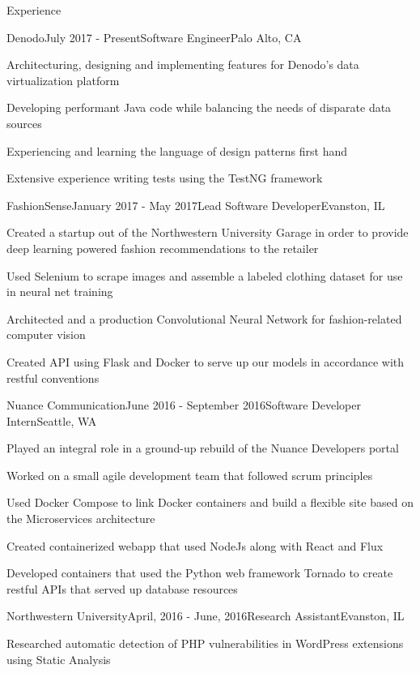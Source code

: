 \documentclass{resume} %
\begin{document}
\begin{rSection}{Experience}

\begin{rSubsection}{Denodo}{July 2017 - Present}{Software Engineer}{Palo Alto, CA}
\item Architecturing, designing and implementing features for Denodo's data virtualization platform
\item Developing performant Java code while balancing the needs of disparate data sources
\item Experiencing and learning the language of design patterns first hand
\item Extensive experience writing tests using the TestNG framework
\end{rSubsection}

\begin{rSubsection}{FashionSense}{January 2017 - May 2017}{Lead Software Developer}{Evanston, IL}
\item Created a startup out of the Northwestern University Garage in order to provide deep learning powered fashion recommendations to the retailer
\item Used Selenium to scrape images and assemble a labeled clothing dataset for use in neural net training
\item Architected and a production Convolutional Neural Network for fashion-related computer vision
\item Created API using Flask and Docker to serve up our models in accordance with restful conventions
\end{rSubsection}


\begin{rSubsection}{Nuance Communication}{June 2016 - September 2016}{Software Developer Intern}{Seattle, WA}
\item Played an integral role in a ground-up rebuild of the Nuance Developers portal
\item Worked on a small agile development team that followed scrum principles
\item Used Docker Compose to link Docker containers and build a flexible site based on the
Microservices architecture
\item Created containerized webapp that used NodeJs along with React and Flux
\item Developed containers that used the Python web framework Tornado to create restful APIs that served up database resources
\end{rSubsection}


\begin{rSubsection}{Northwestern University}{April, 2016 - June, 2016}{Research Assistant}{Evanston, IL}
\item Researched automatic detection of PHP vulnerabilities in WordPress extensions using Static
Analysis
\end{rSubsection}

\end{rSection}
\end{document}
